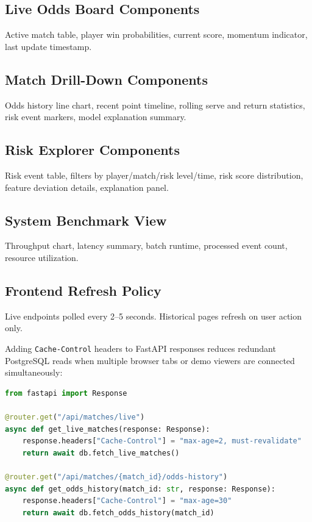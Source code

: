 \documentclass[11pt,a4paper]{article}
\begin{document}
\subsection{Live Odds Board Components}

Active match table, player win probabilities, current score, momentum indicator, last update
timestamp.

\subsection{Match Drill-Down Components}

Odds history line chart, recent point timeline, rolling serve and return statistics, risk event
markers, model explanation summary.

\subsection{Risk Explorer Components}

Risk event table, filters by player/match/risk level/time, risk score distribution, feature
deviation details, explanation panel.

\subsection{System Benchmark View}

Throughput chart, latency summary, batch runtime, processed event count, resource utilization.

\subsection{Frontend Refresh Policy}

Live endpoints polled every 2--5 seconds. Historical pages refresh on user action only.

\begin{minorbox}
Adding \texttt{Cache-Control} headers to FastAPI responses reduces redundant PostgreSQL reads
when multiple browser tabs or demo viewers are connected simultaneously:

\begin{lstlisting}[language=python, caption={routes/live.py --- cache headers}]
from fastapi import Response

@router.get("/api/matches/live")
async def get_live_matches(response: Response):
    response.headers["Cache-Control"] = "max-age=2, must-revalidate"
    return await db.fetch_live_matches()

@router.get("/api/matches/{match_id}/odds-history")
async def get_odds_history(match_id: str, response: Response):
    response.headers["Cache-Control"] = "max-age=30"
    return await db.fetch_odds_history(match_id)
\end{lstlisting}
\end{minorbox}
\end{document}
